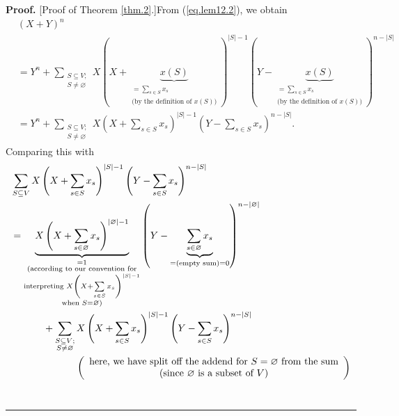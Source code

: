 \documentclass[numbers=enddot,12pt,final,onecolumn,notitlepage]{scrartcl}%
\theoremstyle{definition}
\newenvironment{proof}[1][Proof]{\noindent\textbf{#1.} }{\ \rule{0.5em}{0.5em}}
\let\sumnonlimits\sum
\renewcommand{\sum}{\sumnonlimits\limits}
\newenvironment{verlong}{}{}
\begin{document}
\begin{verlong}
\begin{proof}
[Proof of Theorem \ref{thm.2}.]From (\ref{eq.lem12.2}), we obtain%
\begin{align*}
&  \left(  X+Y\right)  ^{n}\\
&  =Y^{n}+\sum_{\substack{S\subseteq V;\\S\neq\varnothing}}X\left(
X+\underbrace{x\left(  S\right)  }_{\substack{=\sum_{s\in S}x_{s}\\\text{(by
the definition of }x\left(  S\right)  \text{)}}}\right)  ^{\left\vert
S\right\vert -1}\left(  Y-\underbrace{x\left(  S\right)  }_{\substack{=\sum
_{s\in S}x_{s}\\\text{(by the definition of }x\left(  S\right)  \text{)}%
}}\right)  ^{n-\left\vert S\right\vert }\\
&  =Y^{n}+\sum_{\substack{S\subseteq V;\\S\neq\varnothing}}X\left(
X+\sum_{s\in S}x_{s}\right)  ^{\left\vert S\right\vert -1}\left(  Y-\sum_{s\in
S}x_{s}\right)  ^{n-\left\vert S\right\vert }.
\end{align*}
Comparing this with%
\begin{align*}
&  \sum_{S\subseteq V}X\left(  X+\sum_{s\in S}x_{s}\right)  ^{\left\vert
S\right\vert -1}\left(  Y-\sum_{s\in S}x_{s}\right)  ^{n-\left\vert
S\right\vert }\\
&  =\underbrace{X\left(  X+\sum_{s\in\varnothing}x_{s}\right)  ^{\left\vert
\varnothing\right\vert -1}}_{\substack{=1\\\text{(according to our convention
for}\\\text{interpreting }X\left(  X+\sum_{s\in S}x_{s}\right)  ^{\left\vert
S\right\vert -1}\\\text{when }S=\varnothing\text{)}}}\left(
Y-\underbrace{\sum_{s\in\varnothing}x_{s}}_{=\left(  \text{empty sum}\right)
=0}\right)  ^{n-\left\vert \varnothing\right\vert }\\
&  \ \ \ \ \ \ \ \ \ \ +\sum_{\substack{S\subseteq V;\\S\neq\varnothing
}}X\left(  X+\sum_{s\in S}x_{s}\right)  ^{\left\vert S\right\vert -1}\left(
Y-\sum_{s\in S}x_{s}\right)  ^{n-\left\vert S\right\vert }\\
&  \ \ \ \ \ \ \ \ \ \ \ \ \ \ \ \ \ \ \ \ \left(
\begin{array}
[c]{c}%
\text{here, we have split off the addend for }S=\varnothing\text{ from the
sum}\\
\text{(since }\varnothing\text{ is a subset of }V\text{)}%
\end{array}
\right) \\

\end{align*}
\end{proof}
\end{verlong}
\end{document}
